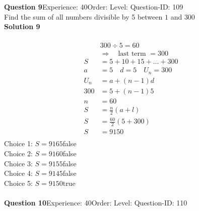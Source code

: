 \documentclass{article}
\begin{document}
\noindent\textbf{Question 9}\hspace{20pt}Experience: 40\hspace{20pt}Order: \hspace{20pt}Level: \hspace{20pt}Question-ID: 109\\[2pt]
Find the sum of all numbers divisible by 5 between $1$ and $300$\\[4pt]
\noindent\textbf{Solution 9}\\[2pt]
\\[-35pt]\begin{align*}
&300 \div 5 = 60\\[2pt]
&\Rightarrow \quad \text{last term }= 300\\[2pt]
S&=5+10+15+...+300\\[12pt]
a&=5\quad d=5 \quad U_n=300\\[2pt]
U_n&=a+(n-1)d\\[2pt]
300&=5+(n-1)5\\[2pt]
n&=60\\[12pt]
S&=\displaystyle\frac{n}{2}(a+l)\\[2pt]
S&=\displaystyle\frac{60}{2}(5+300)\\[2pt]
S&=9150\\[-50pt]
\end{align*}
Choice 1: \hspace{20pt}$S=9165$\hspace{20pt}false\\
Choice 2: \hspace{20pt}$S=9160$\hspace{20pt}false\\
Choice 3: \hspace{20pt}$S=9155$\hspace{20pt}false\\
Choice 4: \hspace{20pt}$S=9145$\hspace{20pt}false\\
Choice 5: \hspace{20pt}$S=9150$\hspace{20pt}true\\
\\[4pt]
\noindent\textbf{Question 10}\hspace{20pt}Experience: 40\hspace{20pt}Order: \hspace{20pt}Level: \hspace{20pt}Question-ID: 110\\[2pt]
\end{document}
